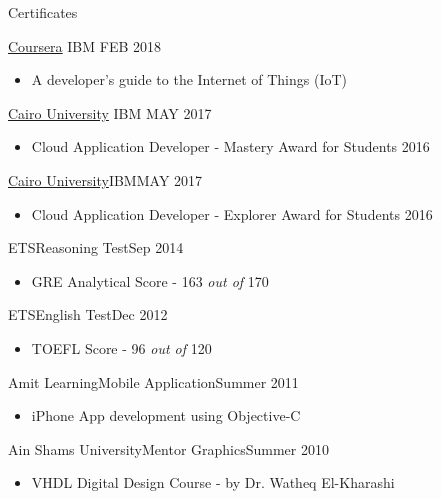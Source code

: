 \documentclass[]{mcdowellcv}
\begin{document}
\begin{cvsection}{Certificates}
\begin{cvsubsection}
			{\href{https://www.youracclaim.com/badges/95fb9f77-9229-4909-bae7-8900f7d605eb/public_url}
				{Coursera}}
			{IBM}
			{FEB 2018}
			\begin{itemize}
				\item A developer's guide to the Internet of Things (IoT)
			\end{itemize}
		\end{cvsubsection}
		\begin{cvsubsection}
			{\href{https://www.youracclaim.com/badges/8db17289-9e32-4ad2-9e28-32bd62c58775/public_url} {Cairo University}}
			{IBM}
			{MAY 2017}
			\begin{itemize}
				\item Cloud Application Developer - Mastery Award for Students 2016
			\end{itemize}
		\end{cvsubsection}
		\begin{cvsubsection}{\href{https://www.youracclaim.com/badges/6bf35fd2-4ce7-463c-a8aa-edf84ac69683/public_url}{Cairo University}}{IBM}{MAY 2017}
			\begin{itemize}
				\item Cloud Application Developer - Explorer Award for Students 2016
			\end{itemize}
		\end{cvsubsection}

		\begin{cvsubsection}{ETS}{Reasoning Test}{Sep 2014}
			\begin{itemize}
				\item GRE Analytical Score - 163 \textit{out of} 170
			\end{itemize}
		\end{cvsubsection}

		\begin{cvsubsection}{ETS}{English Test}{Dec 2012}
			\begin{itemize}
				\item TOEFL Score - 96 \textit{out of} 120
			\end{itemize}
		\end{cvsubsection}

		\begin{cvsubsection}{Amit Learning}{Mobile Application}{Summer 2011}
			\begin{itemize}
				\item iPhone App development using Objective-C
			\end{itemize}
		\end{cvsubsection}

		\begin{cvsubsection}{Ain Shams University}{Mentor Graphics}{Summer 2010}
			\begin{itemize}
				\item VHDL Digital Design Course - by Dr. Watheq El-Kharashi
			\end{itemize}
		\end{cvsubsection}
		
	\end{cvsection}	
	
\end{document}
